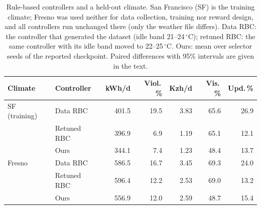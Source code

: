 \begin{table}[t]
\caption{Rule-based controllers and a held-out climate. San Francisco (SF) is the training climate; Fresno was used neither for data collection, training nor reward design, and all controllers run unchanged there (only the weather file differs). Data RBC: the controller that generated the dataset (idle band 21--24\,$^\circ$C); retuned RBC: the same controller with its idle band moved to 22--25\,$^\circ$C. Ours: mean over selector seeds of the reported checkpoint. Paired differences with 95\% intervals are given in the text.}
\label{tab:weather}
\small
\setlength{\tabcolsep}{4pt}
\begin{tabular*}{\columnwidth}{@{\extracolsep{\fill}}llrrrrr@{}}
\toprule
Climate & Controller & kWh/d & Viol.\,\% & Kzh/d & Vis.\,\% & Upd.\,\% \\
\midrule
SF (training) & Data RBC & 401.5 & 19.5 & 3.83 & 65.6 & 26.9 \\
 & Retuned RBC & 396.9 & 6.9 & 1.19 & 65.1 & 12.1 \\
 & Ours & 344.1 & 7.4 & 1.23 & 48.4 & 13.7 \\
\addlinespace
Fresno & Data RBC & 586.5 & 16.7 & 3.45 & 69.3 & 24.0 \\
 & Retuned RBC & 596.4 & 12.2 & 2.53 & 69.0 & 13.2 \\
 & Ours & 556.9 & 12.0 & 2.59 & 48.7 & 15.4 \\
\bottomrule
\end{tabular*}
\end{table}
